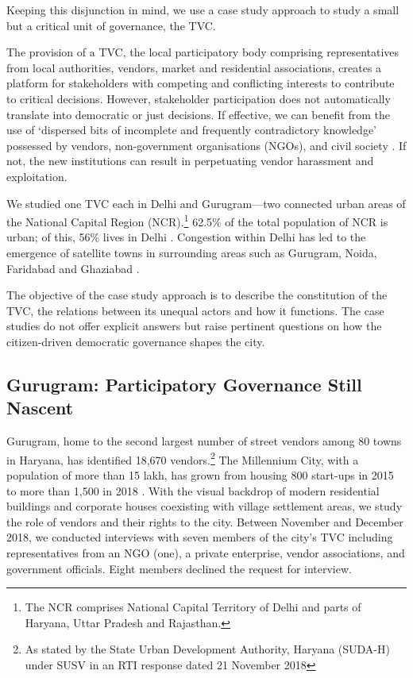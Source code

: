 \documentclass[a4paper, 12pt, twoside, table]{article}
\begin{document}
{Keeping this disjunction in mind, we use a case study approach to study a small but a critical unit of governance, the TVC.

The provision of a TVC, the local participatory body comprising representatives from local authorities, vendors, market and residential associations, creates a platform for stakeholders with competing and conflicting interests to contribute to critical decisions. However, stakeholder participation does not automatically translate into democratic or just decisions. If effective, we can benefit from the use of `dispersed bits of incomplete and frequently contradictory knowledge' possessed by vendors, non-government organisations (NGOs), and civil society \parencite{hayekpaper}. If not, the new institutions can result in perpetuating vendor harassment and exploitation.

We studied one TVC each in Delhi and Gurugram—two connected urban areas of the National Capital Region (NCR).\footnote{ The NCR comprises National Capital Territory of Delhi and parts of Haryana, Uttar Pradesh and Rajasthan.} 62.5\% of the total population of NCR is urban; of this, 56\% lives in Delhi \parencite{ncrpbreport}. Congestion within Delhi has led to the emergence of satellite towns in surrounding areas such as Gurugram, Noida, Faridabad and Ghaziabad \parencite{kpmgreport}.

The objective of the case study approach is to describe the constitution of the TVC, the relations between its unequal actors and how it functions. The case studies do not offer explicit answers but raise pertinent questions on how the citizen-driven democratic governance shapes the city.

\subsection*{Gurugram: Participatory Governance Still Nascent}

Gurugram, home to the second largest number of street vendors among 80 towns in Haryana, has identified 18,670 vendors.\footnote{ As stated by the State Urban Development Authority, Haryana (SUDA-H) under SUSV in an RTI response dated 21 November 2018} The Millennium City, with a population of more than 15 lakh, has grown from housing 800 start-ups in 2015 to more than 1,500 in 2018 \parencite{vermanews}. With the visual backdrop of modern residential buildings and corporate houses coexisting with village settlement areas, we study the role of vendors and their rights to the city. Between November and December 2018, we conducted interviews with seven members of the city's TVC including representatives from an NGO (one), a private enterprise, vendor associations, and government officials. Eight members declined the request for interview.\\

}
\end{document}
